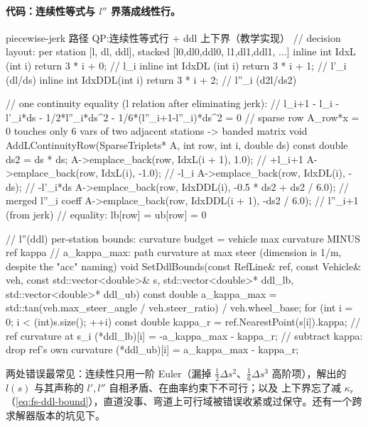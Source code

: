 \paragraph{代码：连续性等式与 $l''$ 界落成线性行。}
\begin{codebox}[C++]{piecewise-jerk 路径 QP:连续性等式行 + ddl 上下界（教学实现）}
// decision layout: per station [l, dl, ddl], stacked [l0,dl0,ddl0, l1,dl1,ddl1, ...]
inline int IdxL  (int i) { return 3 * i + 0; }  // l_i
inline int IdxDL (int i) { return 3 * i + 1; }  // l'_i  (dl/ds)
inline int IdxDDL(int i) { return 3 * i + 2; }  // l''_i (d2l/ds2)

// one continuity equality (l relation after eliminating jerk):
//   l_{i+1} - l_i - l'_i*ds - 1/2*l''_i*ds^2 - 1/6*(l''_{i+1}-l''_i)*ds^2 = 0
// sparse row A_row*x = 0 touches only 6 vars of two adjacent stations -> banded matrix
void AddLContinuityRow(SparseTriplets* A, int row, int i, double ds) {
  const double ds2 = ds * ds;
  A->emplace_back(row, IdxL(i + 1),    1.0);                    // +l_{i+1}
  A->emplace_back(row, IdxL(i),       -1.0);                    // -l_i
  A->emplace_back(row, IdxDL(i),      -ds);                     // -l'_i*ds
  A->emplace_back(row, IdxDDL(i),     -0.5 * ds2 + ds2 / 6.0);  // merged l''_i coeff
  A->emplace_back(row, IdxDDL(i + 1), -ds2 / 6.0);              // l''_{i+1} (from jerk)
  // equality: lb[row] = ub[row] = 0
}

// l''(ddl) per-station bounds: curvature budget = vehicle max curvature MINUS ref kappa
// a_kappa_max: path curvature at max steer (dimension is 1/m, despite the "acc" naming)
void SetDdlBounds(const RefLine& ref, const Vehicle& veh, const std::vector<double>& s,
                  std::vector<double>* ddl_lb, std::vector<double>* ddl_ub) {
  const double a_kappa_max =
      std::tan(veh.max_steer_angle / veh.steer_ratio) / veh.wheel_base;
  for (int i = 0; i < (int)s.size(); ++i) {
    const double kappa_r = ref.NearestPoint(s[i]).kappa;        // ref curvature at s_i
    (*ddl_lb)[i] = -a_kappa_max - kappa_r;   // subtract kappa: drop ref's own curvature
    (*ddl_ub)[i] =  a_kappa_max - kappa_r;
  }
}
\end{codebox}
两处错误最常见：连续性只用一阶 Euler（漏掉 $\tfrac12\Delta s^2$、$\tfrac16\Delta s^3$ 高阶项），解出的 $l(s)$ 与其声称的 $l',l''$ 自相矛盾、在曲率约束下不可行；以及 \verb@ddl@ 上下界忘了减 $\kappa_r$（\cref{eq:fs-ddl-bound}），直道没事、弯道上可行域被错误收紧或过保守。还有一个跨求解器版本的坑见下。

